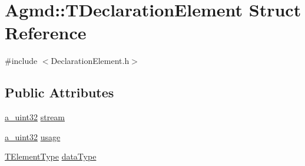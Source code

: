 \hypertarget{struct_agmd_1_1_t_declaration_element}{\section{Agmd\+:\+:T\+Declaration\+Element Struct Reference}
\label{struct_agmd_1_1_t_declaration_element}
}


{\ttfamily \#include $<$Declaration\+Element.\+h$>$}

\subsection*{Public Attributes}
\begin{DoxyCompactItemize}
\item 
\hyperlink{_common_defines_8h_a964296f9770051b9e4807b1f180dd416}{a\+\_\+uint32} \hyperlink{struct_agmd_1_1_t_declaration_element_af9bd657add9402c475ea016ccf832b43}{stream}
\item 
\hyperlink{_common_defines_8h_a964296f9770051b9e4807b1f180dd416}{a\+\_\+uint32} \hyperlink{struct_agmd_1_1_t_declaration_element_a326d7df0b2f1c094309e77de62e3fdaf}{usage}
\item 
\hyperlink{namespace_agmd_aabcc5a3451e707f32340a8ace597c088}{T\+Element\+Type} \hyperlink{struct_agmd_1_1_t_declaration_element_a75d2605927162664b379e891222ba3f5}{data\+Type}
\end{DoxyCompactItemize}


